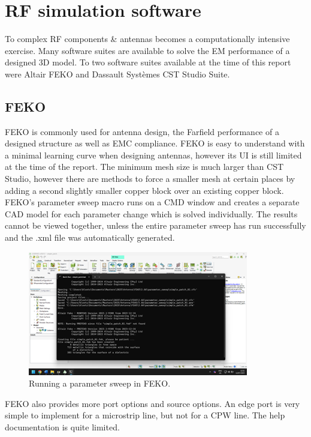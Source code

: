 \section{RF simulation software}
To complex RF components \& antennas becomes a computationally intensive exercise. Many software suites are available to solve the EM performance of a designed 3D model. To two software suites available at the time of this report were Altair FEKO and Dassault Systèmes CST Studio Suite.

\subsection{FEKO}
FEKO is commonly used for antenna design, the Farfield performance of a designed structure as well as EMC compliance. FEKO is easy to understand with a minimal learning curve when designing antennas, however its UI is still limited at the time of the report. The minimum mesh size is much larger than CST Studio, however there are methods to force a smaller mesh at certain places by adding a second slightly smaller copper block over an existing copper block. FEKO’s parameter sweep macro runs on a CMD window and creates a separate CAD model for each parameter change which is solved individually. The results cannot be viewed together, unless the entire parameter sweep has run successfully and the .xml file was automatically generated.

    \begin{figure}[H]
    \centering
    \includegraphics[width=0.9\linewidth]{Figures/chp2_FEKO_parameter_sweep.png}
    \caption{Running a parameter sweep in FEKO.}
    \label{fig:chp2_FEKO_parameter_sweep}
    \end{figure}

FEKO also provides more port options and source options. An edge port is very simple to implement for a microstrip line, but not for a CPW line. The help documentation is quite limited.

